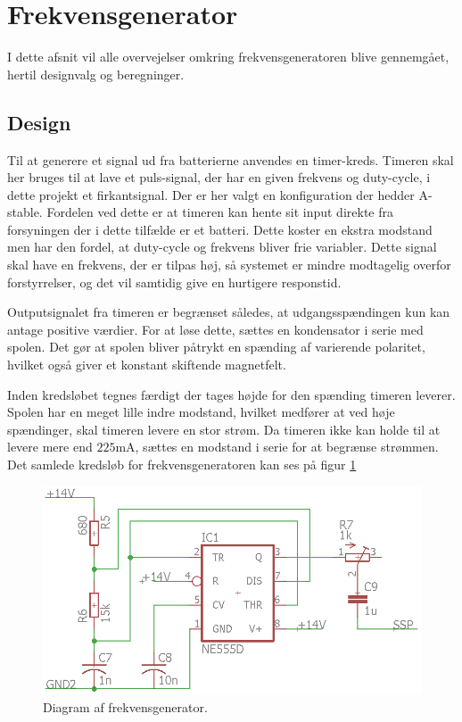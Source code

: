 \section{Frekvensgenerator}\label{sec:frekv_gen}
I dette afsnit vil alle overvejelser omkring frekvensgeneratoren blive gennemgået, hertil designvalg og beregninger. 
\subsection{Design}
Til at generere et signal ud fra batterierne anvendes en timer-kreds. 
Timeren skal her bruges til at lave et puls-signal, der har en given frekvens og duty-cycle, i dette projekt et firkantsignal. 
Der er her valgt en konfiguration der hedder A-stable. 
Fordelen ved dette er at timeren kan hente sit input direkte fra forsyningen der i dette tilfælde er et batteri. Dette koster en ekstra modstand men har den fordel, at duty-cycle og frekvens bliver frie variabler. 
Dette signal skal have en frekvens, der er tilpas høj, så systemet er mindre modtagelig overfor forstyrrelser, og det vil samtidig give en hurtigere responstid. 

Outputsignalet fra timeren er begrænset således, at udgangsspændingen kun kan antage positive værdier.
For at løse dette, sættes en kondensator i serie med spolen.
Det gør at spolen bliver påtrykt en spænding af varierende polaritet, hvilket også giver et konstant skiftende magnetfelt.

Inden kredsløbet tegnes færdigt der tages højde for den spænding timeren leverer. 
Spolen har en meget lille indre modstand, hvilket medfører at ved høje spændinger, skal timeren levere en stor strøm. 
Da timeren ikke kan holde til at levere mere end $225 \si{\milli\ampere}$, sættes en modstand i serie for at begrænse strømmen. Det samlede kredsløb for frekvensgeneratoren kan ses på figur \ref{fig:frekvensgenerator}
\begin{figure}[h!]
	\centering
	\includegraphics[width=.6\textwidth]{billeder/generator.png}
	\caption{Diagram af frekvensgenerator.}
	\label{fig:frekvensgenerator}
\end{figure}


